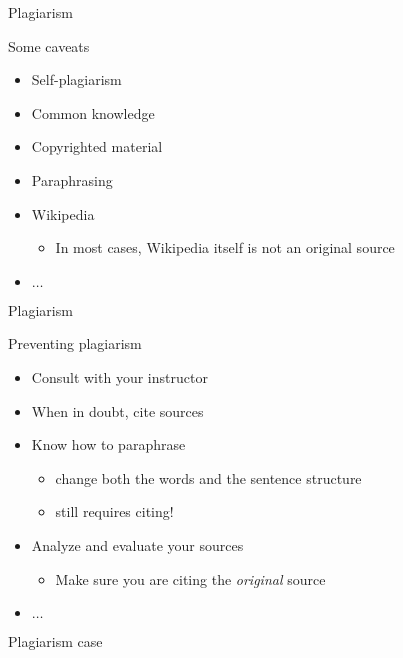 		\begin{frame}{Plagiarism}
			
			Some caveats

			\begin{itemize}
				\item 
					Self-plagiarism
				\item 
					Common knowledge
				\item 
					Copyrighted material
				\item 
					Paraphrasing
				\item 
					Wikipedia
					\begin{itemize}
						\item 
							In most cases, Wikipedia itself is not an original source
					\end{itemize}
				\item 
					$\ldots$
			\end{itemize}

		\end{frame}

		\begin{frame}{Plagiarism}
			
			Preventing plagiarism

			\begin{itemize}
				\item 
					Consult with your instructor
				\item 
					When in doubt, cite sources
				\item 
					Know how to paraphrase
					\begin{itemize}
						\item 
							change both the words and the sentence structure
						\item 
							still requires citing!
					\end{itemize}
				\item 
					Analyze and evaluate your sources
					\begin{itemize}
						\item 
							Make sure you are citing the \emph{original} source
					\end{itemize}
				\item 
					$\ldots$
			\end{itemize}

		\end{frame}

		\begin{frame}[standout]

			Plagiarism case

		\end{frame}

